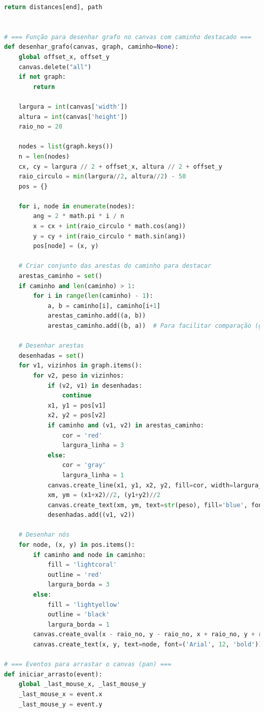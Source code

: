 \documentclass[12pt,a4paper]{report}
\begin{document}
\begin{lstlisting}[language=Python, caption=Dijkstra em Python (parcial)]
    return distances[end], path


# === Função para desenhar grafo no canvas com caminho destacado ===
def desenhar_grafo(canvas, graph, caminho=None):
    global offset_x, offset_y
    canvas.delete("all")
    if not graph:
        return

    largura = int(canvas['width'])
    altura = int(canvas['height'])
    raio_no = 20

    nodes = list(graph.keys())
    n = len(nodes)
    cx, cy = largura // 2 + offset_x, altura // 2 + offset_y
    raio_circulo = min(largura//2, altura//2) - 50
    pos = {}

    for i, node in enumerate(nodes):
        ang = 2 * math.pi * i / n
        x = cx + int(raio_circulo * math.cos(ang))
        y = cy + int(raio_circulo * math.sin(ang))
        pos[node] = (x, y)

    # Criar conjunto das arestas do caminho para destacar
    arestas_caminho = set()
    if caminho and len(caminho) > 1:
        for i in range(len(caminho) - 1):
            a, b = caminho[i], caminho[i+1]
            arestas_caminho.add((a, b))
            arestas_caminho.add((b, a))  # Para facilitar comparação (grafo não-direcionado)

    # Desenhar arestas
    desenhadas = set()
    for v1, vizinhos in graph.items():
        for v2, peso in vizinhos:
            if (v2, v1) in desenhadas:
                continue
            x1, y1 = pos[v1]
            x2, y2 = pos[v2]
            if caminho and (v1, v2) in arestas_caminho:
                cor = 'red'
                largura_linha = 3
            else:
                cor = 'gray'
                largura_linha = 1
            canvas.create_line(x1, y1, x2, y2, fill=cor, width=largura_linha)
            xm, ym = (x1+x2)//2, (y1+y2)//2
            canvas.create_text(xm, ym, text=str(peso), fill='blue', font=('Arial', 10, 'bold'))
            desenhadas.add((v1, v2))

    # Desenhar nós
    for node, (x, y) in pos.items():
        if caminho and node in caminho:
            fill = 'lightcoral'
            outline = 'red'
            largura_borda = 3
        else:
            fill = 'lightyellow'
            outline = 'black'
            largura_borda = 1
        canvas.create_oval(x - raio_no, y - raio_no, x + raio_no, y + raio_no, fill=fill, outline=outline, width=largura_borda)
        canvas.create_text(x, y, text=node, font=('Arial', 12, 'bold'))

# === Eventos para arrastar o canvas (pan) ===
def iniciar_arrasto(event):
    global _last_mouse_x, _last_mouse_y
    _last_mouse_x = event.x
    _last_mouse_y = event.y


\end{lstlisting}
\end{document}
